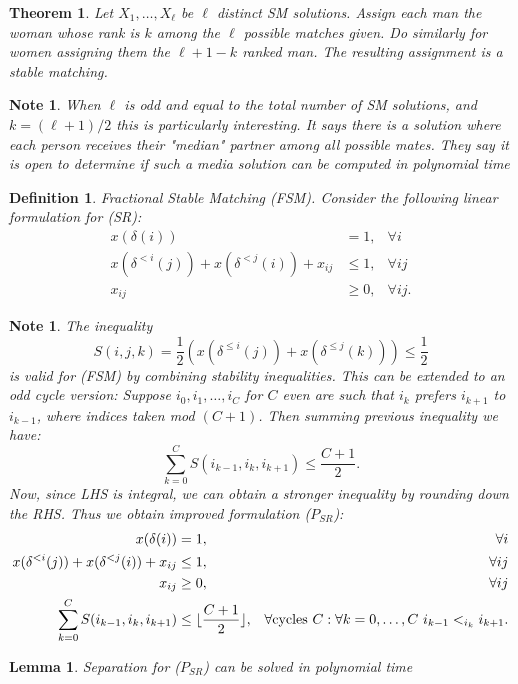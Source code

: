 \documentclass{article}
\DeclarePairedDelimiter\floor{\lfloor}{\rfloor}
\newtheorem{lemma}[fact]{Lemma}
\newtheorem{theorem}[fact]{Theorem}
\newtheorem{definition}[fact]{Definition}
\newtheorem{note}[fact]{Note}
\begin{document}
\begin{theorem}
Let $X_1, \dots, X_\ell$ be $\ell$ distinct SM solutions. Assign each man the woman whose rank is $k$ among the $\ell$ possible matches given. Do similarly for women assigning them the $\ell +1 -k$ ranked man. The resulting assignment is a stable matching.
\end{theorem}
 \begin{note}
 When $\ell$ is odd and equal to the total number of SM solutions, and $k = (\ell + 1)/2$ this is particularly interesting. It says there is a solution where each person receives their "median" partner among all possible mates. They say it is open to determine if such a media solution can be computed in polynomial time
 \end{note}
\begin{definition}
Fractional Stable Matching (FSM). Consider the following linear formulation for (SR):
\begin{align*}
x(\delta(i)) &= 1, &\forall i \\
x(\delta^{<i}(j)) + x(\delta^{<j}(i)) + x_{ij} &\leq 1, &\forall ij \\
x_{ij} &\geq 0, &\forall ij.
\end{align*}
\end{definition}

\begin{note}
The inequality $$S(i,j,k) = \frac{1}{2}(x(\delta^{\leq i}(j)) + x(\delta^{\leq j}(k))) \leq \frac{1}{2} $$ is valid for (FSM) by combining stability inequalities. This can be extended to an odd cycle version: Suppose $i_0, i_1, \dots, i_C$ for $C$ even are such that $i_k$ prefers $i_{k+1}$ to $i_{k-1}$, where indices taken mod $(C+1)$. Then summing previous inequality we have:
$$\sum_{k=0}^C S(i_{k-1},i_{k},i_{k+1}) \leq \frac{C+1}{2}.$$
Now, since LHS is integral, we can obtain a stronger inequality by rounding down the RHS. Thus we obtain improved formulation ($P_{SR}$):
\begin{align*}
x(\delta(i)) &= 1, &\forall i \\
x(\delta^{<i}(j)) + x(\delta^{<j}(i)) + x_{ij} &\leq 1, &\forall ij \\
x_{ij} &\geq 0, &\forall ij\\
\sum_{k=0}^C S(i_{k-1},i_{k},i_{k+1}) &\leq \floor{\frac{C+1}{2}}, &\forall \text{cycles } C: \forall k=0,\dots,C\ i_{k-1} <_{i_k} i_{k+1}.
\end{align*}
\end{note}

\begin{lemma}
Separation for ($P_{SR}$) can be solved in polynomial time
\end{lemma}
\end{document}
